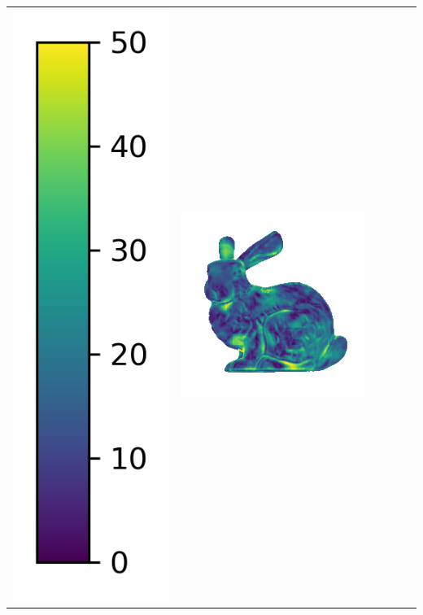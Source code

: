 \begin{center}
\begin{tabularx}{\linewidth}{@{}Y@{}Y@{}Y@{}Y@{}Y@{}Y@{}}
\includegraphics[width=0.2\linewidth]{semisynthetic/colorbar_error_vertical.png} &
\includegraphics[width=\linewidth]{semisynthetic/20160617_14_ours_err.png} &

\end{tabularx}
\end{center}
